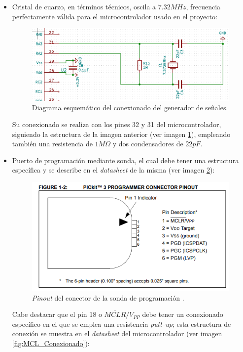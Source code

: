 \begin{itemize}
    \item Cristal de cuarzo, en términos técnicos, oscila a $7.32MHz$, frecuencia perfectamente válida para el microcontrolador usado en el proyecto:
    
    \begin{figure}[H]
    \centering 
    \includegraphics[width=.7\linewidth]{pictures/Cristal.PNG}
    \caption{Diagrama esquemático del conexionado del generador de señales.}
    \label{fig:Cristal}
    \end{figure}
    
    Su conexionado se realiza con los pines 32 y 31 del microcontrolador, siguiendo la estructura de la imagen anterior (ver imagen \ref{fig:Cristal}), empleando también una resistencia de $1 M\Omega$ y dos condensadores de $22 pF$.
    
    \item Puerto de programación mediante sonda, el cual debe tener una estructura específica y se describe en el \textit{datasheet} de la misma (ver imagen \ref{fig:Sonda_Conexionado}):
    
    \begin{figure}[H]
    \centering 
    \includegraphics[width=.5\linewidth]{pictures/Sonda.PNG}
    \caption{\textit{Pinout} del conector de la sonda de programación \cite{DsPIC33EP512GM60416BitMicrocontrollers}.}
    \label{fig:Sonda_Conexionado}
    \end{figure}
    
     Cabe destacar que el pin 18 o $\overline{MCLR}/V_{PP}$ debe tener un conexionado específico en el que se emplea una resistencia \textit{pull--up}; esta estructura de conexión se muestra en el \textit{datasheet} del microcontrolador (ver imagen \ref{fig:MCL_Conexionado}):
     

\end{itemize}
